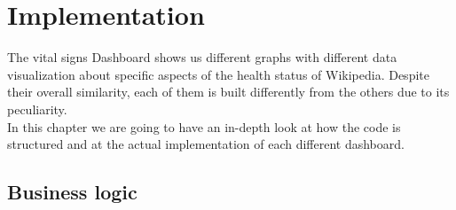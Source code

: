 \chapter{Implementation}
\label{cha:implementation}

The vital signs Dashboard shows us different graphs with different data visualization about specific aspects of the health status of Wikipedia. Despite their overall similarity, each of them is built differently from the others due to its peculiarity.\\
In this chapter we are going to have an in-depth look at how the code is structured and at the actual implementation of each different dashboard.\\

\section{Business logic}
\label{sec:business_logic}

